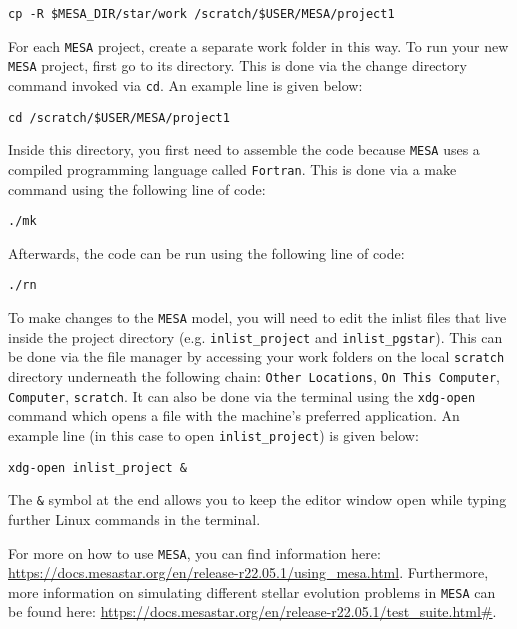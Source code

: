 \documentclass[11pt,a4paper]{article}
\begin{document}
\begin{verbatim}
cp -R $MESA_DIR/star/work /scratch/$USER/MESA/project1
\end{verbatim}

\noindent
For each \texttt{MESA} project, create a separate work folder in this way. To run your new \texttt{MESA} project, first go to its directory. This is done via the change directory command invoked via \texttt{cd}. An example line is given below:

\begin{verbatim}
cd /scratch/$USER/MESA/project1
\end{verbatim}

\noindent
Inside this directory, you first need to assemble the code because \texttt{MESA} uses a compiled programming language called \texttt{Fortran}. This is done via a make command using the following line of code: 

\begin{verbatim}
./mk
\end{verbatim}

\noindent
Afterwards, the code can be run using the following line of code: 

\begin{verbatim}
./rn
\end{verbatim}

\noindent
To make changes to the \texttt{MESA} model, you will need to edit the inlist files that live inside the project directory (e.g. \texttt{inlist\_project} and \texttt{inlist\_pgstar}). This can be done via the file manager by accessing your work folders on the local \texttt{scratch} directory underneath the following chain: \texttt{Other Locations}, \texttt{On This Computer}, \texttt{Computer}, \texttt{scratch}. It can also be done via the terminal using the \texttt{xdg-open} command which opens a file with the machine's preferred application. An example line (in this case to open \texttt{inlist\_project}) is given below:

\begin{verbatim}
xdg-open inlist_project &
\end{verbatim}

\noindent
The \texttt{\&} symbol at the end allows you to keep the editor window open while typing further Linux commands in the terminal.

\bigskip\noindent
For more on how to use \texttt{MESA}, you can find information here: \url{https://docs.mesastar.org/en/release-r22.05.1/using_mesa.html}. Furthermore, more information on simulating different stellar evolution problems in \texttt{MESA} can be found here: \url{https://docs.mesastar.org/en/release-r22.05.1/test_suite.html#}.
\end{document}

